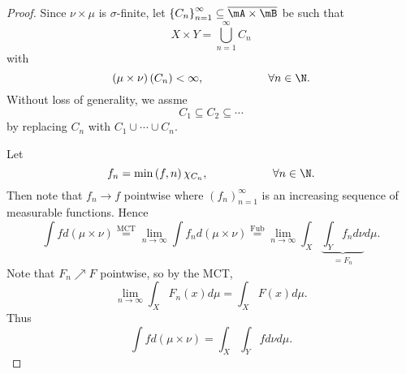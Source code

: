 \documentclass[pmath451]{subfiles}
\begin{document}
    \begin{proof}
        Since $\nu\times\mu$ is $\sigma$-finite, let $\left\lbrace C_n \right\rbrace^{\infty}_{n=1}\subseteq\overline{\mA\times\mB}$ be such that
        \begin{equation*}
            X\times Y = \bigcup^{\infty}_{n=1} C_n
        \end{equation*}
        with
        \begin{equation*}
            \left( \mu\times\nu \right)\left( C_n \right) < \infty,\hspace{2cm}\forall n\in\N.
        \end{equation*}
        Without loss of generality, we assme
        \begin{equation*}
            C_1\subseteq C_2\subseteq\cdots
        \end{equation*}
        by replacing $C_n$ with $C_1\cup\cdots\cup C_n$.

        Let
        \begin{equation*}
            f_n = \min\left( f,n \right)\chi_{C_n}, \hspace{2cm}\forall n\in\N.
        \end{equation*}
        Then note that $f_n\to f$ pointwise where $\left( f_{n} \right)^{\infty}_{n=1}$ is an increasing sequence of measurable functions. Hence
        \begin{equation*}
            \int fd\left( \mu\times\nu \right) \overset{\text{MCT}}{=} \lim_{n\to\infty}\int f_nd\left( \mu\times\nu \right) \overset{\text{Fub}}{=} \lim_{n\to\infty} \int_X\underbrace{\int_Y f_nd\nu}_{=F_n} d\mu.
        \end{equation*}
        Note that $F_n\nearrow F$ pointwise, so by the MCT,
        \begin{equation*}
            \lim_{n\to\infty}\int_X F_n\left( x \right)d\mu = \int_XF\left( x \right)d\mu.
        \end{equation*}
        Thus
        \begin{equation*}
            \int fd\left( \mu\times\nu \right) = \int_X\int_Yfd\nu d\mu.
        \end{equation*}
    \end{proof}

    
    
    
    
    
    
    
    
    
    
    
    
    
    
    
    
    
    
    
    
    
    
    
    
    
    
    
    
    
    
    
    
    
    
    
    
    
\end{document}
